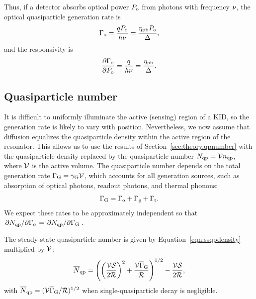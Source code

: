 Thus, if a detector absorbs optical power $P_{\mathrm{o}}$ from photons with frequency $\nu$, the optical quasiparticle generation rate is
\begin{equation}
\Gamma_{\mathrm{o}}
  =
  \frac{q P_{\mathrm{o}}}{h \nu}
  =
  \frac{\eta_\mathrm{pb} P_{\mathrm{o}}}{\Delta},
\label{eqn:optical_generation.response}
\end{equation}
and the responsivity is
\begin{equation}
\pdv{\Gamma_{\mathrm{o}}}{P_{\mathrm{o}}}
  =
  \frac{q}{h \nu}
  =
  \frac{\eta_\mathrm{pb}}{\Delta}.
\label{eqn:optical_generation.responsivity}
\end{equation}


\subsection{Quasiparticle number}
\label{sec:theory.response.qpnumber}

It is difficult to uniformly illuminate the active (sensing) region of a KID, so the generation rate is likely to vary with position.
Nevertheless, we now assume that diffusion  equalizes the quasiparticle density within the active region of the resonator.
This allows us to use the results of Section~\ref{sec:theory.qpnumber} with the quasiparticle density replaced by the quasiparticle number
$N_{\mathrm{qp}} = \mathcal{V} n_{\mathrm{qp}}$,
where $\mathcal{V}$ is the active volume.
The quasiparticle number depends on the total generation rate
$\Gamma_{\mathrm{G}} = \gamma_{\mathrm{G}} \mathcal{V}$,
which accounts for all generation sources, such as absorption of optical photons, readout photons, and thermal phonons:
\begin{equation}
\Gamma_{\mathrm{G}}
  =
  \Gamma_{\mathrm{o}} + \Gamma_\varrho + \Gamma_{\mathrm{t}}.
\end{equation}
We expect these rates to be approximately independent so that
$
\pdv*{N_{\mathrm{qp}}}{\Gamma_{\mathrm{o}}}
  =
  \pdv*{N_{\mathrm{qp}}}{\Gamma_{\mathrm{G}}}.
$

The steady-state quasiparticle number is given by Equation~\ref{eqn:ssqpdensity} multiplied by $\mathcal{V}$:
\begin{equation}
\overline{N}_{\mathrm{qp}}
  = 
  \left( \left(\frac{\mathcal{V} \mathcal{S}}{2 \mathcal{R}}\right)^2
  + \frac{\mathcal{V} \overline{\Gamma}_{\mathrm{G}}}{\mathcal{R}} \right)^{1/2}
  - \frac{\mathcal{V} \mathcal{S}}{2 \mathcal{R}},
\label{eqn:qpnumber.response}
\end{equation}
with
$\overline{N}_{\mathrm{qp}} = (\mathcal{V} \overline{\Gamma}_{\mathrm{G}} / \mathcal{R})^{1/2}$
when single-quasiparticle decay is negligible.

